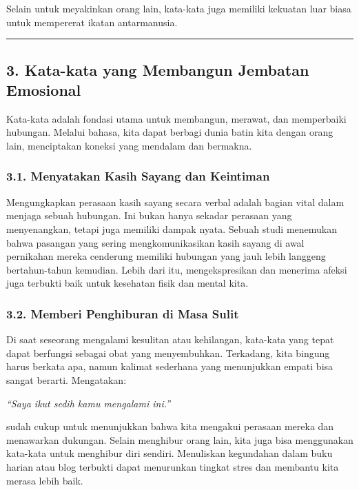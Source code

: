 \documentclass[
  letterpaper,
  DIV=11,
  numbers=noendperiod]{scrreprt}
\begin{document}
Selain untuk meyakinkan orang lain, kata-kata juga memiliki kekuatan
luar biasa untuk mempererat ikatan antarmanusia.

\begin{center}\rule{0.5\linewidth}{0.5pt}\end{center}

\subsection{3. Kata-kata yang Membangun Jembatan
Emosional}\label{kata-kata-yang-membangun-jembatan-emosional}

Kata-kata adalah fondasi utama untuk membangun, merawat, dan memperbaiki
hubungan. Melalui bahasa, kita dapat berbagi dunia batin kita dengan
orang lain, menciptakan koneksi yang mendalam dan bermakna.

\subsubsection{3.1. Menyatakan Kasih Sayang dan
Keintiman}\label{menyatakan-kasih-sayang-dan-keintiman}

Mengungkapkan perasaan kasih sayang secara verbal adalah bagian vital
dalam menjaga sebuah hubungan. Ini bukan hanya sekadar perasaan yang
menyenangkan, tetapi juga memiliki dampak nyata. Sebuah studi menemukan
bahwa pasangan yang sering mengkomunikasikan kasih sayang di awal
pernikahan mereka cenderung memiliki hubungan yang jauh lebih langgeng
bertahun-tahun kemudian. Lebih dari itu, mengekspresikan dan menerima
afeksi juga terbukti baik untuk kesehatan fisik dan mental kita.

\subsubsection{3.2. Memberi Penghiburan di Masa
Sulit}\label{memberi-penghiburan-di-masa-sulit}

Di saat seseorang mengalami kesulitan atau kehilangan, kata-kata yang
tepat dapat berfungsi sebagai obat yang menyembuhkan. Terkadang, kita
bingung harus berkata apa, namun kalimat sederhana yang menunjukkan
empati bisa sangat berarti. Mengatakan:

\emph{``Saya ikut sedih kamu mengalami ini.''}

sudah cukup untuk menunjukkan bahwa kita mengakui perasaan mereka dan
menawarkan dukungan. Selain menghibur orang lain, kita juga bisa
menggunakan kata-kata untuk menghibur diri sendiri. Menuliskan
kegundahan dalam buku harian atau blog terbukti dapat menurunkan tingkat
stres dan membantu kita merasa lebih baik.
\end{document}
